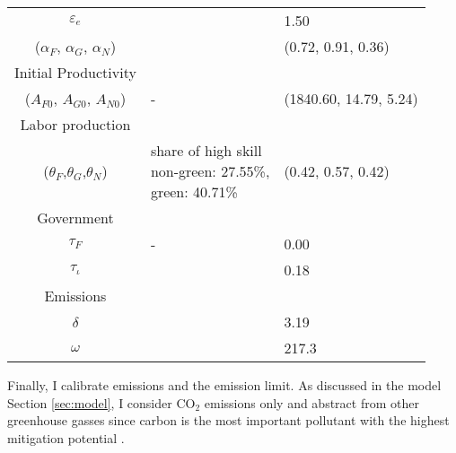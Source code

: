 \begin{table}[h!]
\begin{center}
{\begin{tabular}{c|ll}
 			$\varepsilon_e$&&1.50\\	
			($\alpha_F$, $\alpha_G$, $\alpha_N$)&\cite{Fried2018ClimateAnalysis} &(0.72, 0.91, 0.36)\\
 			\hline
 			Initial Productivity&\multicolumn{2}{c}{}\\
 			\hline
 			($A_{F0}$, $A_{G0}$, $A_{N0}$)&- &(1840.60, 14.79, 5.24)  \\
 			\hline 
 				Labor production&\multicolumn{2}{c}{}\\ 			
 			\hline
 			($\theta_F$,$\theta_G$,$\theta_N$)&\makecell[l]{share of high skill\\ non-green: 27.55\%,\\ green: 40.71\% \citep{Consoli2016DoCapital} }& (0.42, 0.57, 0.42)\\
 			\hline
 			Government&\multicolumn{2}{c}{}\\
 			\hline
 			$\tau_F$&- &0.00\\
 			$\tau_\iota$&\cite{Heathcote2017OptimalFramework} &0.18\\
 			\hline
 			Emissions&\multicolumn{2}{c}{}\\
 			\hline
 			$\delta$& \makecell[l]{\cite{EPAems}}&3.19\\
 			$\omega$& \cite{EPAems}&217.3\\
 			\hline \hline
 		\end{tabular}
 	}
 	\end{center}
 \end{table}
 
 
 Finally, I calibrate emissions and the emission limit. As discussed in the model Section \ref{sec:model},  I consider CO$_2$ emissions only and abstract from other greenhouse gasses since carbon is the most important pollutant with the highest mitigation potential \citep[p.29]{IPCC2022}.
 

